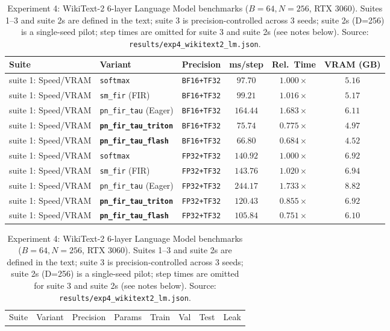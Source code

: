 \documentclass[11pt,a4paper]{article}
\begin{document}
\begin{table}[ht!]
\centering
\caption{Experiment 4: WikiText-2 6-layer Language Model benchmarks ($B=64, N=256$, RTX 3060). Suites 1--3 and suite 2s are defined in the text; suite 3 is precision-controlled across 3 seeds; suite 2s (D=256) is a single-seed pilot; step times are omitted for suite 3 and suite 2s (see notes below). Source: \texttt{results/exp4\_wikitext2\_lm.json}.}
\label{tab:exp4}
\scriptsize
\setlength{\tabcolsep}{3.0pt}
\begin{tabular}{llcccc}
\toprule
Suite & Variant & Precision & ms/step & Rel.\ Time & VRAM (GB) \\
\midrule
suite 1: Speed/VRAM & \texttt{softmax} & \texttt{BF16+TF32} & $97.70$ & $1.000\times$ & $5.16$ \\
suite 1: Speed/VRAM & \texttt{sm\_fir} (FIR) & \texttt{BF16+TF32} & $99.21$ & $1.016\times$ & $5.17$ \\
suite 1: Speed/VRAM & \texttt{pn\_fir\_tau} (Eager) & \texttt{BF16+TF32} & $164.44$ & $1.683\times$ & $6.11$ \\
suite 1: Speed/VRAM & \textbf{\texttt{pn\_fir\_tau\_triton}} & \texttt{BF16+TF32} & $\mathbf{75.74}$ & $\mathbf{0.775\times}$ & $\mathbf{4.97}$ \\
suite 1: Speed/VRAM & \textbf{\texttt{pn\_fir\_tau\_flash}} & \texttt{BF16+TF32} & $\mathbf{66.80}$ & $\mathbf{0.684\times}$ & $\mathbf{4.52}$ \\
suite 1: Speed/VRAM & \texttt{softmax} & \texttt{FP32+TF32} & $140.92$ & $1.000\times$ & $6.92$ \\
suite 1: Speed/VRAM & \texttt{sm\_fir} (FIR) & \texttt{FP32+TF32} & $143.76$ & $1.020\times$ & $6.94$ \\
suite 1: Speed/VRAM & \texttt{pn\_fir\_tau} (Eager) & \texttt{FP32+TF32} & $244.17$ & $1.733\times$ & $8.82$ \\
suite 1: Speed/VRAM & \textbf{\texttt{pn\_fir\_tau\_triton}} & \texttt{FP32+TF32} & $\mathbf{120.43}$ & $\mathbf{0.855\times}$ & $\mathbf{6.92}$ \\
suite 1: Speed/VRAM & \textbf{\texttt{pn\_fir\_tau\_flash}} & \texttt{FP32+TF32} & $\mathbf{105.84}$ & $\mathbf{0.751\times}$ & $\mathbf{6.10}$ \\
\bottomrule
\end{tabular}
\vspace{0.6em}
\setlength{\tabcolsep}{2.2pt}
\begin{tabular}{llcccccc}
\toprule
Suite & Variant & Precision & Params & Train & Val & Test & Leak \\

\end{tabular}
\end{table}
\end{document}

